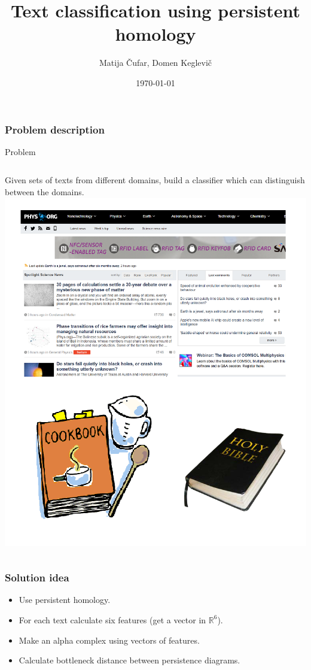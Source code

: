 \documentclass[unknownkeysallowed]{beamer}
\title[Text Analysis]{Text classification using persistent homology} %
\author{Matija Čufar, Domen Keglevič} %
\institute[] %
{
Faculty of Computer and Information Science \\ %
\medskip
}
\date{\today} %
\def\R{\mathbb R}
\begin{document}
\begin{frame}
\titlepage %
\end{frame}

\begin{frame}
\frametitle{Problem description} 
\begin{block}{Problem}
\begin{columns}[c]
	Given sets of texts from different domains, build a classifier which can distinguish between the domains.
	\includegraphics[width=0.9\linewidth]{different_domains}
\end{columns}
\end{block}
\end{frame}

\begin{frame}
\frametitle{Solution idea}
\begin{itemize}
\item Use persistent homology.
\bigskip
\item For each text calculate six features (get a vector in $\R ^6$).
\bigskip
\item Make an alpha complex using vectors of features.
\bigskip
\item Calculate bottleneck distance between persistence diagrams.
\end{itemize}
\end{frame}
\end{document}
